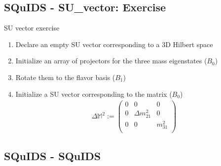 \documentclass[]{beamer}
\begin{document}
\subsection{SQuIDS - SU\_vector: Exercise}

\begin{frame}
\end{frame}

\begin{frame}{SU vector exercise}
  \begin{enumerate}
    \item Declare an empty SU vector corresponding to a 3D Hilbert space
    \item Initialize an array of projectors for the three mass eigenstates (\(B_0\))
    \item Rotate them to the flavor basis (\(B_1\))
    \item Initialize a SU vector corresponding to the matrix (\(B_0\))
    \begin{align}
      \Delta \mathbb{M}^2 := \begin{pmatrix}
        0 & 0 & 0 \\
        0 & \Delta m_{21}^2 & 0 \\
        0 & 0 & m_{31}^2 \\
      \end{pmatrix}
    \end{align}
  \end{enumerate}
\end{frame}

\subsection{SQuIDS - SQuIDS}

\begin{frame}
\end{frame}
\end{document}
